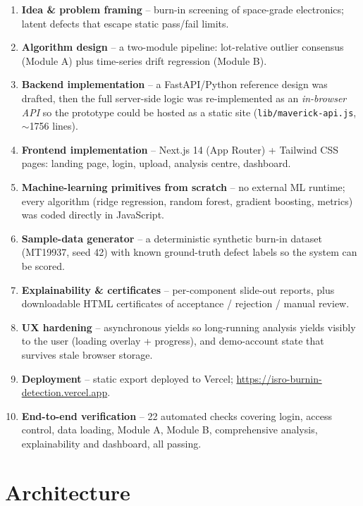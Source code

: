 \documentclass[11pt,a4paper]{article}
\newcommand{\code}[1]{\texttt{\small #1}}
\begin{document}
\begin{enumerate}[leftmargin=1.5em]
  \item \textbf{Idea \& problem framing} -- burn-in screening of space-grade electronics;
        latent defects that escape static pass/fail limits.
  \item \textbf{Algorithm design} -- a two-module pipeline: lot-relative outlier consensus
        (Module A) plus time-series drift regression (Module B).
  \item \textbf{Backend implementation} -- a FastAPI/Python reference design was drafted, then
        the full server-side logic was re-implemented as an \emph{in-browser API} so the
        prototype could be hosted as a static site (\code{lib/maverick-api.js}, $\sim$1756 lines).
  \item \textbf{Frontend implementation} -- Next.js 14 (App Router) + Tailwind CSS pages:
        landing page, login, upload, analysis centre, dashboard.
  \item \textbf{Machine-learning primitives from scratch} -- no external ML runtime; every
        algorithm (ridge regression, random forest, gradient boosting, metrics) was coded
        directly in JavaScript.
  \item \textbf{Sample-data generator} -- a deterministic synthetic burn-in dataset
        (MT19937, seed 42) with known ground-truth defect labels so the system can be scored.
  \item \textbf{Explainability \& certificates} -- per-component slide-out reports, plus
        downloadable HTML certificates of acceptance / rejection / manual review.
  \item \textbf{UX hardening} -- asynchronous yields so long-running analysis yields visibly to
        the user (loading overlay + progress), and demo-account state that survives stale
        browser storage.
  \item \textbf{Deployment} -- static export deployed to Vercel;
        \url{https://isro-burnin-detection.vercel.app}.
  \item \textbf{End-to-end verification} -- 22 automated checks covering login, access control,
        data loading, Module A, Module B, comprehensive analysis, explainability and dashboard,
        all passing.
\end{enumerate}

\section{Architecture}
\label{sec:arch}
\end{document}
